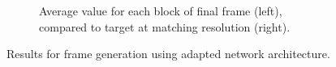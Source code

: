 \documentclass[letterpaper]{article} %
\begin{document}
\begin{figure}[h!]
\begin{subfigure}{\textwidth}
\begin{center}
\begin{minipage}[t]{0.95\linewidth}
\begin{centering}
\caption{Average value for each block of final frame (left), compared to target 
at 
matching resolution (right).}
\label{fig:subdiv_avg}
\end{centering}
\end{minipage}
\end{center}
\end{subfigure}
\caption{Results for frame generation using adapted network architecture.}
\label{fig:results}
\end{figure}
\end{document}
